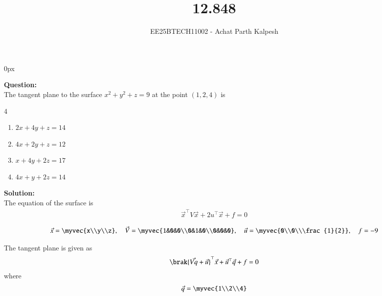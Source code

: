 \documentclass[journal]{IEEEtran}
\begin{document}

\title{12.848}
\author{EE25BTECH11002 - Achat Parth Kalpesh }
{\let\newpage\relax\maketitle}
\renewcommand{\thefigure}{\theenumi}
\renewcommand{\thetable}{\theenumi}
\setlength{\intextsep}{10pt} %
\renewcommand{\thetable}{\theenumi}
\parindent 0px



\textbf{Question:}\\
The tangent plane to the surface $x^2 + y^2 + z = 9$ at the point $(1, 2, 4)$ is
\begin{multicols}{4}
\begin{enumerate}
        \item $2x+4y+z=14$
        \item $4x+2y+z=12$
        \item $x+4y+2z=17$
        \item $4x+y+2z=14$
\end{enumerate}
\end{multicols}

\textbf{Solution:}\\
The equation of the surface is\\
\begin{align}
\vec{x}^\top V \vec{x} + 2u^\top \vec{x} + f = 0
\end{align}

\begin{align}
\vec{x} = \myvec{x\\y\\z}, \quad 
\vec{V} = \myvec{1&0&0\\0&1&0\\0&0&0}, \quad
\vec{u} = \myvec{0\\0\\\frac{1}{2}}, \quad
f = -9
\end{align}

The tangent plane is given as
\begin{align}
    \brak{\vec{Vq} + \vec{u}}^\top \vec{x} + \vec{u}^\top \vec{q} + f = 0
\end{align}
where
\begin{align}
    \vec{q} = \myvec{1\\2\\4}
\end{align}
\end{document}
